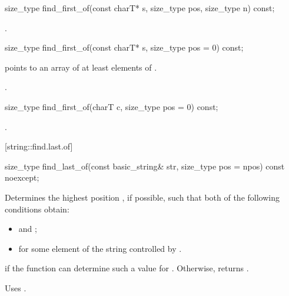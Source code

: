 %
%
\begin{itemdecl}
size_type
  find_first_of(const charT* s, size_type pos, size_type n) const;
\end{itemdecl}

\begin{itemdescr}
\pnum
\returns
{}.
\end{itemdescr}

%
%
\begin{itemdecl}
size_type find_first_of(const charT* s, size_type pos = 0) const;
\end{itemdecl}

\begin{itemdescr}
\pnum
\requires {} points to an array of at least 
elements of .

\pnum
\returns
{}.
\end{itemdescr}

%
%
\begin{itemdecl}
size_type find_first_of(charT c, size_type pos = 0) const;
\end{itemdecl}

\begin{itemdescr}
\pnum
\returns
{}.
\end{itemdescr}

[string::find.last.of]{}

%
%
\begin{itemdecl}
size_type
  find_last_of(const basic_string& str,
               size_type pos = npos) const noexcept;
\end{itemdecl}

\begin{itemdescr}
\pnum
\effects
Determines the highest position , if possible, such that both of
the following conditions obtain:

\begin{itemize}
\item
{}
and
;
\item
{}%
for some element  of the string controlled by .
\end{itemize}

\pnum
\returns
{} if the function can determine such a value for .
Otherwise, returns
.

\pnum
\notes
Uses
.
\end{itemdescr}


